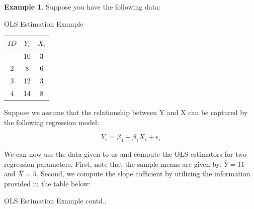 \documentclass[
]{book}
\theoremstyle{definition}
\theoremstyle{definition}
\newtheorem{example}{Example}[chapter]
\theoremstyle{definition}
\theoremstyle{definition}
\theoremstyle{remark}
\begin{document}
\begin{example}
\protect\hypertarget{exm:unnamed-chunk-2}{}\label{exm:unnamed-chunk-2}Suppose you have the following data:

\label{tab:ch3table1} OLS Estimation Example

\begin{longtable}[]{@{}ccc@{}}
\toprule\noalign{}
\(ID\) & \(Y_i\) & \(X_i\) \\
\midrule\noalign{}
\endhead
\bottomrule\noalign{}
\endlastfoot
1 & 10 & 3 \\
2 & 8 & 6 \\
3 & 12 & 3 \\
4 & 14 & 8 \\
\end{longtable}

Suppose we assume that the relationship between Y and X can be captured by the following regression model:

\[Y_i=\beta_0 + \beta_1 X_i + \epsilon_i\]

We can now use the data given to us and compute the OLS estimators for two regression parameters. First, note that the sample means are given by: \(\overline{Y}=11\) and \(\overline{X}=5\). Second, we compute the slope cofficient by utilizing the information provided in the table below:

\label{tab:ch3table2} OLS Estimation Example contd..


\end{example}
\end{document}
